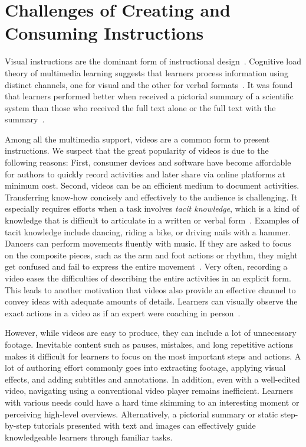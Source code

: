 
\section{Challenges of Creating and Consuming Instructions}

Visual instructions are the dominant form of instructional design~\cite{mijksenaar1999open}. Cognitive load theory of multimedia learning suggests that learners process information using distinct channels, one for visual and the other for verbal formats~\cite{sweller1998cognitive,sweller1988cognitive,paas2003cognitive}. It was found that learners performed better when received a pictorial summary of a scientific system than those who received the full text alone or the full text with the summary~\cite{mayer1996less}.

Among all the multimedia support, videos are a common form to present instructions. We suspect that the great popularity of videos is due to the following reasons:
%
First, consumer devices and software have become affordable for authors to quickly record activities and later share via online platforms at minimum cost.
%
Second, videos can be an efficient medium to document activities. Transferring know-how concisely and effectively to the audience is challenging. It especially requires efforts when a task involves \emph{tacit knowledge}, which is a kind of knowledge that is difficult to articulate in a written or verbal form~\cite{polanyi1958personal, Klemmer:2006:BMF:1142405.1142429}. Examples of tacit knowledge include dancing, riding a bike, or driving nails with a hammer. Dancers can perform movements fluently with music. If they are asked to focus on the composite pieces, such as the arm and foot actions or rhythm, they might get confused and fail to express the entire movement~\cite{polanyi1958personal}. Very often, recording a video eases the difficulties of describing the entire activities in an explicit form.
%
This leads to another motivation that videos also provide an effective channel to convey ideas with adequate amounts of details. Learners can visually observe the exact actions in a video as if an expert were coaching in person~\cite{Kuznetsov:2010:REA:1868914.1868950}.

However, while videos are easy to produce, they can include a lot of unnecessary footage. Inevitable content such as pauses, mistakes, and long repetitive actions makes it difficult for learners to focus on the most important steps and actions. A lot of authoring effort commonly goes into extracting footage, applying visual effects, and adding subtitles and annotations.
%
In addition, even with a well-edited video, navigating using a conventional video player remains inefficient. Learners with various needs could have a hard time skimming to an interesting moment or perceiving high-level overviews. Alternatively, a pictorial summary or static step-by-step tutorials presented with text and images can effectively guide knowledgeable learners through familiar tasks.

